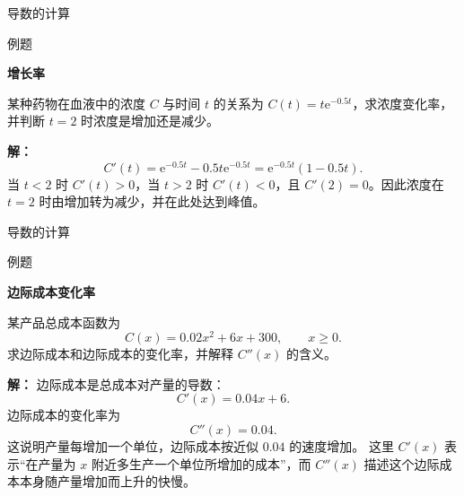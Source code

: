 \documentclass[aspectratio=169,10pt,fontset=fandol]{ctexbeamer}
\newcommand{\ee}{\mathrm{e}}
\begin{document}
\begin{frame}[t,fragile]{导数的计算}
\normalsize
\begin{block}{例题}
{\normalsize
\textbf{增长率}\par

某种药物在血液中的浓度 $C$ 与时间 $t$ 的关系为 $C(t)=t\ee^{-0.5t}$，求浓度变化率，并判断 $t=2$ 时浓度是增加还是减少。

}
\end{block}
\pause
{\normalsize
\textbf{解：}
\[
C'(t)=\ee^{-0.5t}-0.5t\ee^{-0.5t}=\ee^{-0.5t}(1-0.5t).
\]
当 \(t<2\) 时 \(C'(t)>0\)，当 \(t>2\) 时 \(C'(t)<0\)，且 \(C'(2)=0\)。因此浓度在 \(t=2\) 时由增加转为减少，并在此处达到峰值。

}
\end{frame}
\begin{frame}[t,fragile]{导数的计算}
\footnotesize
\begin{block}{例题}
{\footnotesize
\textbf{边际成本变化率}\par

某产品总成本函数为
\[
C(x)=0.02x^2+6x+300,\qquad x\geq0.
\]
求边际成本和边际成本的变化率，并解释 $C''(x)$ 的含义。

}
\end{block}
\pause
{\footnotesize
\textbf{解：}
边际成本是总成本对产量的导数：
\[
C'(x)=0.04x+6.
\]
边际成本的变化率为
\[
C''(x)=0.04.
\]
这说明产量每增加一个单位，边际成本按近似 $0.04$ 的速度增加。 这里 $C'(x)$ 表示“在产量为 $x$ 附近多生产一个单位所增加的成本”，而 $C''(x)$ 描述这个边际成本本身随产量增加而上升的快慢。

}
\end{frame}
\end{document}
